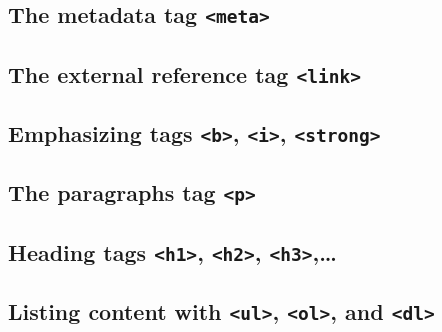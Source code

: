 \documentclass[
]{book}
\theoremstyle{definition}
\theoremstyle{remark}
\begin{document}
\hypertarget{the-metadata-tag-meta}{%
\subsection{\texorpdfstring{The metadata tag \texttt{\textless{}meta\textgreater{}}}{The metadata tag \textless meta\textgreater{}}}\label{the-metadata-tag-meta}}

\hypertarget{the-external-reference-tag-link}{%
\subsection{\texorpdfstring{The external reference tag \texttt{\textless{}link\textgreater{}}}{The external reference tag \textless link\textgreater{}}}\label{the-external-reference-tag-link}}

\hypertarget{emphasizing-tags-b-i-strong}{%
\subsection{\texorpdfstring{Emphasizing tags \texttt{\textless{}b\textgreater{}}, \texttt{\textless{}i\textgreater{}}, \texttt{\textless{}strong\textgreater{}}}{Emphasizing tags \textless b\textgreater, \textless i\textgreater, \textless strong\textgreater{}}}\label{emphasizing-tags-b-i-strong}}

\hypertarget{the-paragraphs-tag-p}{%
\subsection{\texorpdfstring{The paragraphs tag \texttt{\textless{}p\textgreater{}}}{The paragraphs tag \textless p\textgreater{}}}\label{the-paragraphs-tag-p}}

\hypertarget{heading-tags-h1-h2-h3}{%
\subsection{\texorpdfstring{Heading tags \texttt{\textless{}h1\textgreater{}}, \texttt{\textless{}h2\textgreater{}}, \texttt{\textless{}h3\textgreater{}},\ldots{}}{Heading tags \textless h1\textgreater, \textless h2\textgreater, \textless h3\textgreater,\ldots{}}}\label{heading-tags-h1-h2-h3}}

\hypertarget{listing-content-with-ul-ol-and-dl}{%
\subsection{\texorpdfstring{Listing content with \texttt{\textless{}ul\textgreater{}}, \texttt{\textless{}ol\textgreater{}}, and \texttt{\textless{}dl\textgreater{}}}{Listing content with \textless ul\textgreater, \textless ol\textgreater, and \textless dl\textgreater{}}}\label{listing-content-with-ul-ol-and-dl}}
\end{document}
